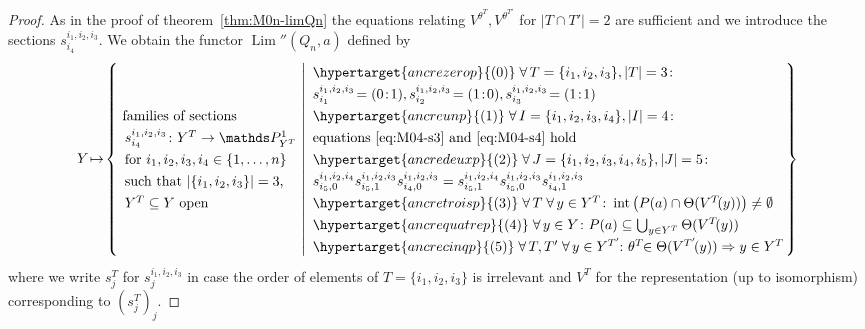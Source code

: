 \documentclass[ALCO,ThmDefs,Unicode,epreuves]{cedram}
\def\P{\mathds P}
\DeclareMathOperator{\interior}{int}
\DeclareMathOperator{\Lim}{Lim}
\begin{document}
\begin{proof}
As in the proof of theorem~\ref{thm:M0n-limQn} the equations relating
$V^{\theta^T}\!\!,V^{\theta^{T'}}\!$ for $|T\cap T'|=2$ are sufficient and we
introduce the sections $s^{i_1,i_2,i_3}_{i_4}$. We obtain the functor
$\Lim''(Q_n,a)$ defined by
\[\textstyle
Y\!\mapsto\!
\left\{
\begin{array}{l}\!
\text{families of sections}\\
s^{i_1,i_2,i_3}_{i_4}\colon Y^T\to\P^1_{Y^T}\\
\text{for $i_1,i_2,i_3,i_4\in\{1,\ldots,n\}$}\\
\text{such that $|\{i_1,i_2,i_3\}|=3$,}\\
\text{$Y^T\subseteq Y$ open}
\end{array}\!
\!\left|
{\renewcommand{\arraystretch}{1.3}
\begin{array}{l}
\hypertarget{ancrezerop}{(0)}\;\forall\,T=\{i_1,i_2,i_3\}, |T|=3\colon\\
s^{i_1,i_2,i_3}_{i_1}\!=(0\!:\!1),s^{i_1,i_2,i_3}_{i_2}\!=(1\!:\!0), 
s^{i_1,i_2,i_3}_{i_3}\!=(1\!:\!1)\\
\hypertarget{ancreunp}{(1)}\;\forall\,I=\{i_1,i_2,i_3,i_4\}, |I|=4\colon\\
\text{equations~\eqref{eq:M04-s3} and~\eqref{eq:M04-s4} hold}\\
\hypertarget{ancredeuxp}{(2)}\;\forall\,J=\{i_1,i_2,i_3,i_4,i_5\}, |J|=5\colon\\
s^{i_1,i_2,i_4}_{i_5,0}s^{i_1,i_2,i_3}_{i_5,1}s^{i_1,i_2,i_3}_{i_4,0}
=s^{i_1,i_2,i_4}_{i_5,1}s^{i_1,i_2,i_3}_{i_5,0}s^{i_1,i_2,i_3}_{i_4,1}\\
\hypertarget{ancretroisp}{(3)}\;\forall\,T\;\forall\,y\in Y^T\colon\interior\big(P(a)\cap \Theta(V^T\!(y))\big)
\neq\emptyset\\
\hypertarget{ancrequatrep}{(4)}\;\forall\,y\in Y\colon P(a)\subseteq\bigcup_{y\in Y^T}\Theta(V^T\!(y))\\
\hypertarget{ancrecinqp}{(5)}\;\forall\,T,T'\;\forall\,y\in Y^{T'}\!\colon \theta^T\!\!\in \Theta(V^{T'}\!(y))
\Rightarrow y\in Y^T
\end{array}}
\!\!\!\right.\right\}
\]
where we write $s^T_j$ for $s^{i_1,i_2,i_3}_j$ in case the order of elements of 
$T=\{i_1,i_2,i_3\}$ is irrelevant and $V^T$ for the representation (up to isomorphism) 
corresponding to $(s^T_j)_j$.


\end{proof}
\end{document}
